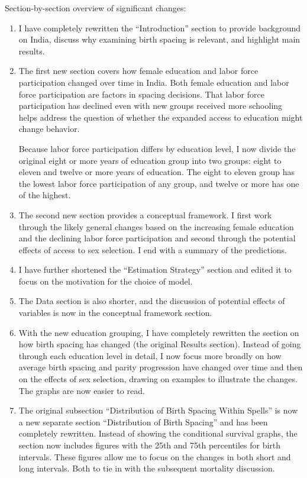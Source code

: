 \documentclass[letterpaper,12pt]{article}
\begin{document}
Section-by-section overview of significant changes:
\begin{enumerate}

\item I have completely rewritten the ``Introduction'' section to provide background on 
India, discuss why examining birth spacing is relevant, and highlight main results.

\item The first new section covers how female education and labor force
participation changed over time in India. Both female education and
labor force participation are factors in spacing decisions. That labor
force participation has declined even with new groups received more
schooling helps address the question of whether the expanded access to
education might change behavior. 

Because labor force participation differs by education level, I now divide the original 
eight or more years of education group into two groups: eight to eleven and twelve or
more years of education. The eight to eleven group has the lowest labor
force participation of any group, and twelve or more has one of the
highest.

\item The second new section provides a conceptual framework.
I first work through the likely general changes based on the increasing female education 
and the declining labor force participation and second through the potential effects of 
access to sex selection.
I end with a summary of the predictions.

\item I have further shortened the ``Estimation Strategy'' section and
edited it to focus on the motivation for the choice of model.

\item The Data section is also shorter, and the discussion of potential
effects of variables is now in the conceptual framework section.

\item With the new education grouping, I have completely rewritten the
section on how birth spacing has changed (the original Results section).
Instead of going through each education level in detail, I now focus
more broadly on how average birth spacing and parity progression have
changed over time and then on the effects of sex selection, drawing on
examples to illustrate the changes. The graphs are now easier to read.

\item The original subsection ``Distribution of Birth Spacing Within
Spells'' is now a new separate section ``Distribution of Birth Spacing''
and has been completely rewritten. Instead of showing the conditional
survival graphs, the section now includes figures with the 25th and 75th
percentiles for birth intervals. These figures allow me to focus on the
changes in both short and long intervals. Both to tie in with the
subsequent mortality discussion.


\end{enumerate}
\end{document}
